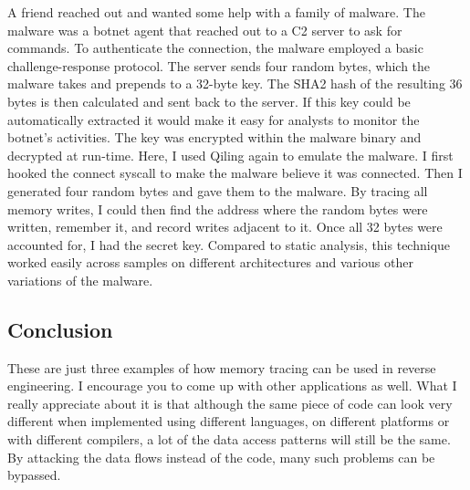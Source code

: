 \documentclass[twocolumn]{article}
\begin{document}
A friend reached out and wanted some help with a family of malware. The malware was a botnet agent that reached out to a C2 server to ask for commands. To authenticate the connection, the malware employed a basic challenge-response protocol. The server sends four random bytes, which the malware takes and prepends to a 32-byte key. The SHA2 hash of the resulting 36 bytes is then calculated and sent back to the server. If this key could be automatically extracted it would make it easy for analysts to monitor the botnet's activities. The key was encrypted within the malware binary and decrypted at run-time. Here, I used Qiling again to emulate the malware. I first hooked the connect syscall to make the malware believe it was connected. Then I generated four random bytes and gave them to the malware. By tracing all memory writes, I could then find the address where the random bytes were written, remember it, and record writes adjacent to it. Once all 32 bytes were accounted for, I had the secret key. Compared to static analysis, this technique worked easily across samples on different architectures and various other variations of the malware.

\vspace*{-0.5\baselineskip}
\subsection*{Conclusion}

These are just three examples of how memory tracing can be used in reverse engineering. I encourage you to come up with other applications as well. What I really appreciate about it is that although the same piece of code can look very different when implemented using different languages, on different platforms or with different compilers, a lot of the data access patterns will still be the same. By attacking the data flows instead of the code, many such problems can be bypassed.

\end{document}
